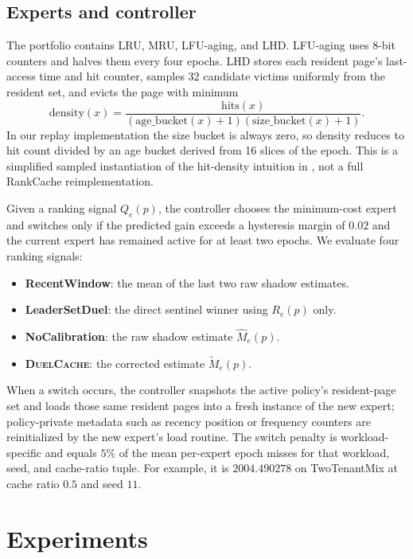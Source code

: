 \documentclass{article}
\newcommand{\duel}{\textsc{DuelCache}}
\newcommand{\rawm}{\hat{M}}
\newcommand{\corrm}{\tilde{M}}
\begin{document}
\subsection{Experts and controller}

The portfolio contains LRU, MRU, LFU-aging, and LHD. LFU-aging uses 8-bit counters and halves them every four epochs. LHD stores each resident page's last-access time and hit counter, samples 32 candidate victims uniformly from the resident set, and evicts the page with minimum
\[
\mathrm{density}(x)=\frac{\mathrm{hits}(x)}{(\mathrm{age\_bucket}(x)+1)(\mathrm{size\_bucket}(x)+1)}.
\]
In our replay implementation the size bucket is always zero, so density reduces to hit count divided by an age bucket derived from 16 slices of the epoch. This is a simplified sampled instantiation of the hit-density intuition in \citet{beckmann2018lhd}, not a full RankCache reimplementation.

Given a ranking signal $Q_e(p)$, the controller chooses the minimum-cost expert and switches only if the predicted gain exceeds a hysteresis margin of $0.02$ and the current expert has remained active for at least two epochs. We evaluate four ranking signals:
\begin{itemize}
\item \textbf{RecentWindow}: the mean of the last two raw shadow estimates.
\item \textbf{LeaderSetDuel}: the direct sentinel winner using $R_e(p)$ only.
\item \textbf{NoCalibration}: the raw shadow estimate $\rawm_e(p)$.
\item \textbf{\duel}: the corrected estimate $\corrm_e(p)$.
\end{itemize}

When a switch occurs, the controller snapshots the active policy's resident-page set and loads those same resident pages into a fresh instance of the new expert; policy-private metadata such as recency position or frequency counters are reinitialized by the new expert's load routine. The switch penalty is workload-specific and equals $5\%$ of the mean per-expert epoch misses for that workload, seed, and cache-ratio tuple. For example, it is $2004.490278$ on TwoTenantMix at cache ratio $0.5$ and seed $11$.

\section{Experiments}
\label{sec:experiments}
\end{document}
